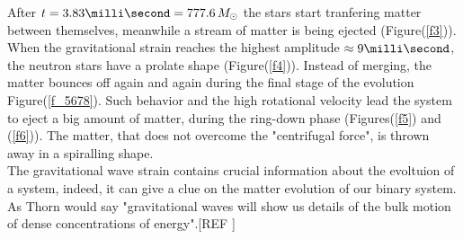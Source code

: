 After $t = 3.83 \milli \second = 777.6 \, M _{\odot}$ the stars start tranfering matter between themselves, meanwhile a stream of matter is being ejected (Figure(\ref{f3})).\\
When the gravitational strain reaches the highest amplitude $\approx 9 \milli \second$, the neutron stars have a prolate shape (Figure(\ref{f4})).
Instead of merging, the matter bounces off again and again during the final stage of the evolution Figure(\ref{f_5678}).
Such behavior and the high rotational velocity lead the system to eject a big amount of matter, during the ring-down phase (Figures(\ref{f5}) and (\ref{f6})). 
The matter, that does not overcome the "centrifugal force", is thrown away in a spiralling shape.\\
The gravitational wave strain contains crucial information about the evoltuion of a system, indeed, it can give a clue on the matter evolution of our binary system.
As Thorn would say "gravitational waves will show us details of the bulk motion of dense concentrations of energy".[REF ]%


